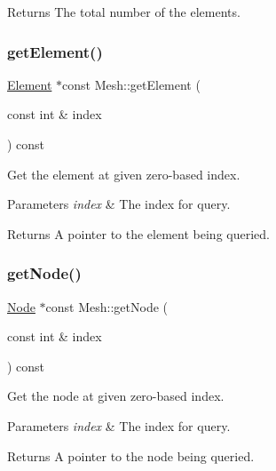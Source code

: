 \begin{DoxyReturn}{Returns}
The total number of the elements. 
\end{DoxyReturn}
\mbox{\label{class_mesh_ada2ae7b8640a3999780d7e738ee4154e}} 
\subsubsection{\texorpdfstring{get\+Element()}{getElement()}}
{\footnotesize\ttfamily \mbox{\hyperlink{class_element}{Element}} $\ast$const Mesh\+::get\+Element (\begin{DoxyParamCaption}\item[{const int \&}]{index }\end{DoxyParamCaption}) const}



Get the element at given zero-\/based index. 


\begin{DoxyParams}{Parameters}
{\em index} & The index for query. \\
\hline
\end{DoxyParams}
\begin{DoxyReturn}{Returns}
A pointer to the element being queried. 
\end{DoxyReturn}
\mbox{\label{class_mesh_a071a8dfe15c00fcabc9c4071306487d4}} 
\subsubsection{\texorpdfstring{get\+Node()}{getNode()}}
{\footnotesize\ttfamily \mbox{\hyperlink{class_node}{Node}} $\ast$const Mesh\+::get\+Node (\begin{DoxyParamCaption}\item[{const int \&}]{index }\end{DoxyParamCaption}) const}



Get the node at given zero-\/based index. 


\begin{DoxyParams}{Parameters}
{\em index} & The index for query. \\
\hline
\end{DoxyParams}
\begin{DoxyReturn}{Returns}
A pointer to the node being queried. 
\end{DoxyReturn}
\mbox{\label{class_mesh_ae596a597115563fb308d99e5e15a62e6}} 
